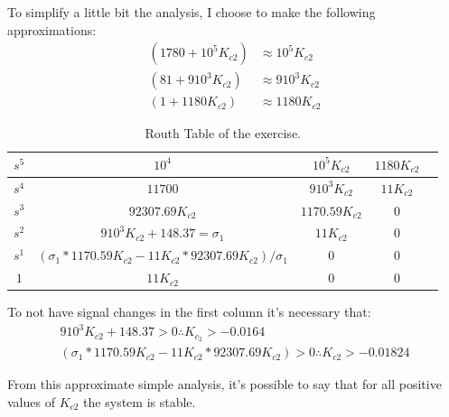\documentclass[a4paper]{article}
\begin{document}
To simplify a little bit the analysis, I choose to make the following approximations:
\begin{align*}
(1780+10^5K_{c2})&\approx10^5K_{c2}\\
(81+910^3K_{c2})&\approx910^3K_{c2}\\
(1+1180K_{c2})&\approx1180K_{c2}
\end{align*}
\begin{table}[H]
\centering
\begin{tabular}{| c | c| c | c|c|}
	\hline	
	$s^5$&$10^4$  & $10^5K_{c2}$ & $1180K_{c2}$ \\
    \hline
    $s^4$&$11700$& $910^3K_{c2}$ & $11K_{c2}$\\
    \hline
    $s^3$ & $92307.69K_{c2}$&$1170.59K_{c2}$&0\\
    \hline
    $s^2$&$910^3K_{c2}+148.37=\sigma_1$& $11K_{c2}$ &0\\
    \hline
    $s^1$ & $(\sigma_1*1170.59K_{c2}-11K_{c2}*92307.69K_{c2})/\sigma_1$&0 &0\\
    \hline
    $1$ & $11K_{c2}$ & 0 & 0\\
	\hline   
    \end{tabular}
    \caption{Routh Table of the exercise.}
    \label{tab:routh_table_ex_6}
\end{table}
To not have signal changes in the first column it's necessary that:
\begin{align*}
910^3K_{c2}+148.37>0 \therefore K_{c_2}>-0.0164\\
(\sigma_1*1170.59K_{c2}-11K_{c2}*92307.69K_{c2})>0 \therefore K_{c2}>-0.01824
\end{align*}

From this approximate simple analysis, it's possible to say that for all positive values of $K_{c2}$ the system is stable.
\end{document}
